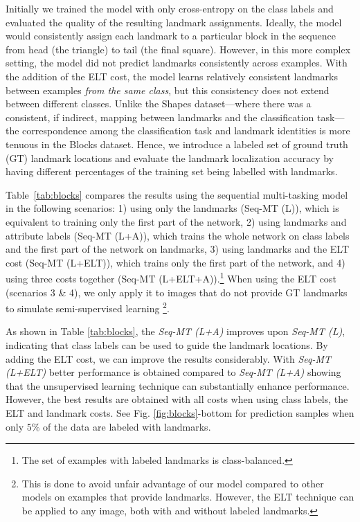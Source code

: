 \documentclass[10pt,twocolumn,letterpaper]{article}
\begin{document}
Initially we trained the model with only cross-entropy on the class labels and evaluated the quality of the resulting landmark assignments. Ideally, the model would consistently assign each landmark to a particular block in the sequence from head (the triangle) to tail (the final square). However, in this more complex setting, the model did not predict landmarks consistently across examples. With the addition of the ELT cost, the model learns relatively consistent landmarks between examples \emph{from the same class}, but this consistency does not extend between different classes. Unlike the Shapes dataset---where there was a consistent, if indirect, mapping between landmarks and the classification task---the correspondence among the classification task and landmark identities is more tenuous in the Blocks dataset.
Hence, we introduce a labeled set of ground truth (GT) landmark locations and evaluate the landmark localization accuracy by having different percentages of the training set being labelled with landmarks.

Table~\ref{tab:blocks} compares the results using the sequential multi-tasking model in the following scenarios: 1) using only the landmarks (Seq-MT (L)), which is equivalent to training only the first part of the network, 2) using landmarks and attribute labels (Seq-MT (L+A)), which trains the whole network on class labels and the first part of the network on landmarks, 3) using landmarks and the ELT cost (Seq-MT (L+ELT)), which trains only the first part of the network, and 4) using three costs together (Seq-MT (L+ELT+A)).\footnote{The set of examples with labeled landmarks is class-balanced.} When using the ELT cost (scenarios 3 \& 4), we only apply it to images that do not provide GT landmarks to simulate semi-supervised learning 
\footnote{This is done to avoid unfair advantage of our model compared to other models on examples that provide landmarks. However, the ELT technique can be applied to any image, both with and without labeled landmarks.}.

As shown in Table \ref{tab:blocks}, the \emph{Seq-MT (L+A)} improves upon \emph{Seq-MT (L)}, indicating that class labels can be used to guide the landmark locations. By adding the ELT cost, we can improve the results considerably. With \emph{Seq-MT (L+ELT)} better performance is obtained compared to \emph{Seq-MT (L+A)} showing that the unsupervised learning technique can substantially enhance performance. However, the best results are obtained with all costs when using class labels, the ELT and landmark costs. See Fig. \ref{fig:blocks}-bottom for prediction samples when only $5\%$ of the data are labeled with landmarks.
\end{document}
